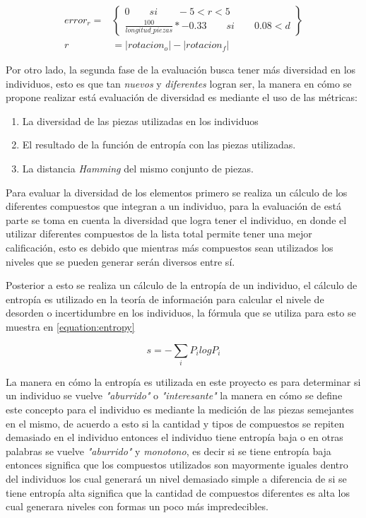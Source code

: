 \begin{equation}
    \begin{split}
      error_{r} = & 
      \begin{Bmatrix}
        0 \qquad si \qquad -5 < r < 5 \\ 
        \frac{100}{longitud\_piezas} * -0.33 \qquad si \qquad 0.08 < d
      \end{Bmatrix} \\
       r & = \left | rotacion_o \right | - \left | rotacion_f \right |
    \end{split}
    \label{equation:error_ang}
\end{equation}

Por otro lado, la segunda fase de la evaluación busca tener más diversidad en los
individuos, esto es que tan \textit{nuevos} y \textit{diferentes} logran ser, la
manera en cómo se propone realizar está evaluación de diversidad es mediante el
uso de las métricas:
\begin{enumerate}
    \item La diversidad de las piezas utilizadas en los individuos
    \item El resultado de la función de entropía con las piezas utilizadas.
    \item La distancia \textit{Hamming} del mismo conjunto de piezas.
\end{enumerate}

Para evaluar la diversidad de los elementos primero se realiza un cálculo de los
diferentes compuestos que integran a un individuo, para la evaluación de está
parte se toma en cuenta la diversidad que logra tener el individuo, en donde el
utilizar diferentes compuestos de la lista total permite tener una mejor
calificación, esto es debido que mientras más compuestos sean utilizados los
niveles que se pueden generar serán diversos entre sí.

Posterior a esto se realiza un cálculo de la entropía de un individuo, el
cálculo de entropía es utilizado en la teoría de información para calcular el
nivele de desorden o incertidumbre en los individuos, la fórmula que se utiliza
para esto se muestra en \ref{equation:entropy}

\begin{equation}
  s = -\sum _{i} P_i log P_i
  \label{equation:entropy}
\end{equation}

La manera en cómo la entropía es utilizada en este proyecto es para determinar
si un individuo se vuelve \textit{"aburrido"} o \textit{"interesante"} la manera
en cómo se define este concepto para el individuo es mediante la medición de las
piezas semejantes en el mismo, de acuerdo a esto si la cantidad y tipos de
compuestos se repiten demasiado en el individuo entonces el individuo tiene
entropía baja o en otras palabras se vuelve \textit{"aburrido"} y
\textit{monotono}, es decir si se tiene entropía baja entonces significa que los
compuestos utilizados son mayormente iguales dentro del individuos los cual
generará un nivel demasiado simple a diferencia de si se tiene entropía alta
significa que la cantidad de compuestos diferentes es alta los cual generara
niveles con formas un poco más impredecibles.

